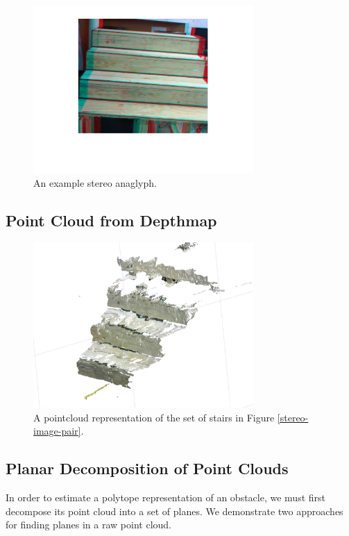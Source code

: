 \begin{figure}[!h]
\centering
\includegraphics[width=3.3in]{Sections/Figures/stereo_anaglyph.png}
\caption{An example stereo anaglyph.}
\label{stereo-anaglyph}
\end{figure}

\subsection{Point Cloud from Depthmap}

\begin{figure}[!h]
\centering
\includegraphics[width=3.3in]{Sections/Figures/example_stairs_pointcloud.jpg}
\caption{A pointcloud representation of the set of stairs in Figure \ref{stereo-image-pair}.}
\label{pointcloud-example}
\end{figure}

\subsection{Planar Decomposition of Point Clouds}

In order to estimate a polytope representation of an obstacle, we must first decompose its point cloud into a set of planes.
We demonstrate two approaches for finding planes in a raw point cloud. 

